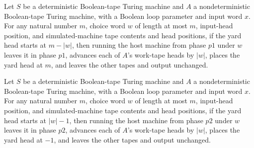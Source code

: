 \begin{theorem}
\label{Turing.ClockHost.p1_marks}
\leanok
{}
Let $S$ be a deterministic Boolean-tape Turing machine and $A$ a nondeterministic
Boolean-tape Turing machine, with a Boolean loop parameter and input word $x$. For any
natural number $m$, choice word $w$ of length at most $m$, input-head position, and
simulated-machine tape contents and head positions, if the yard head starts at $m-|w|$,
then running the host machine from phase $p1$ under $w$ leaves it in phase $p1$,
advances each of $A$’s work-tape heads by $|w|$, places the yard head at $m$, and leaves
the other tapes and output unchanged.
\end{theorem}

\begin{theorem}
\label{Turing.ClockHost.p2_marks}
\leanok
{}
Let $S$ be a deterministic Boolean-tape Turing machine and $A$ a nondeterministic
Boolean-tape Turing machine, with a Boolean loop parameter and input word $x$. For any
natural number $m$, choice word $w$ of length at most $m$, input-head position, and
simulated-machine tape contents and head positions, if the yard head starts at $|w|-1$,
then running the host machine from phase $p2$ under $w$ leaves it in phase $p2$,
advances each of $A$’s work-tape heads by $|w|$, places the yard head at $-1$, and
leaves the other tapes and output unchanged.
\end{theorem}

